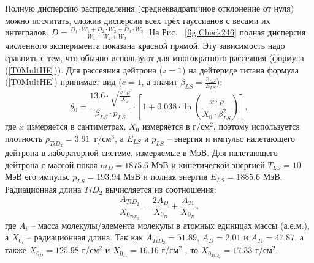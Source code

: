 \documentclass[a4paper,12pt]{article}
\begin{document}
\begin{large}
  
  
  
  Полную дисперсию распределения (среднеквадратичное отклонение от нуля) можно посчитать, сложив дисперсии всех трёх гауссианов с весами их интегралов: $D=\frac{D_1\cdot W_1+D_2\cdot W_2+D_3\cdot W_3}{W_1+W_2+W_3}$.
  На Рис. ~\ref{fig:Check246} полная дисперсия численного эксперимента показана красной прямой.
  Эту зависимость надо сравнить с тем, что обычно используют для многократного рассеяния (формула (\ref{T0MultHE})).  
  Для рассеяния дейтрона ($z=1$) на дейтериде титана формула (\ref{T0MultHE}) принимает вид ($c=1$, а значит $\beta_{LS}=\frac{p_{LS}}{E_{LS}}$):
\begin{equation}
  \label{CheckTheta0Coefficient}
  \theta_0=\frac{13.6 \cdot \sqrt{\frac{x\cdot \rho}{X_0}}}{\beta_{LS}\cdot p_{LS}}\cdot\left[ 1+0.038\cdot\ln\left(\frac{x\cdot \rho}{X_0\cdot \beta^2_{LS}}\right)\right],
\end{equation}
где $x$ измеряется в сантиметрах, $X_0$ измеряется в г/см$^2$, поэтому используется плотность $\rho_{TiD_2}=3.91$~г/см$^3$, а $E_{LS}$ и $p_{LS}$ -- энергия и импульс налетающего дейтрона в лабораторной системе, измеряемые в МэВ. Для налетающего дейтрона с массой покоя $m_D=1875.6$ МэВ и кинетической энергией $T_{LS}=10$ МэВ его импульс $p_{LS}=193.94$ МэВ и полная энергия $E_{LS}=1885.6$ МэВ. Радиационная длина $TiD_2$ вычисляется из соотношения:
\begin{equation}
  \label{RadLength}
  \frac{A_{TiD_2}}{X_{0_{TiD_2}}}=\frac{2 A_{D}}{X_{0_{D}}}+\frac{A_{Ti}}{X_{0_{Ti}}},
\end{equation}
где $A_i$ -- масса молекулы/элемента молекулы в атомных единицах массы (а.е.м.), а $X_{0_i}$ -- радиационная длина.
  Так как $A_{TiD_2}=51.89$, $A_{D}=2.01$ и $A_{Ti}=47.87$, а также $X_{0_{D}}=125.98$ г/см$^2$ и $X_{0_{Ti}}=16.16$ г/см$^2$ \cite{PDG}, то $X_{0_{TiD_2}}=17.33$ г/см$^2$.


\end{large}
\end{document}
